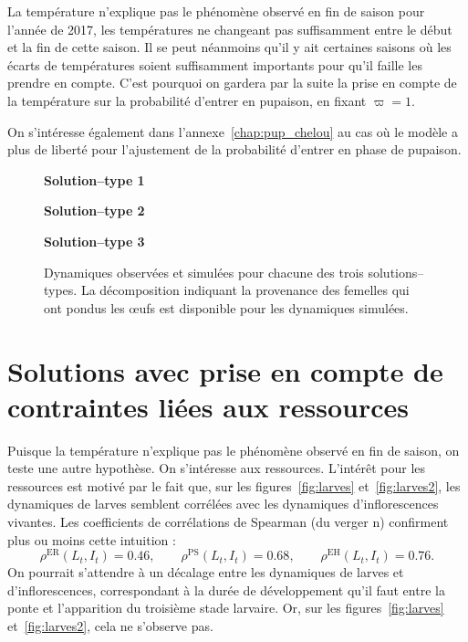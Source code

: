 La température n'explique pas le phénomène observé en fin de saison pour l'année de 2017, les températures ne changeant pas suffisamment entre le début et la fin de cette saison.
Il se peut néanmoins qu'il y ait certaines saisons où les écarts de températures soient suffisamment importants pour qu'il faille les prendre en compte.
C'est pourquoi on gardera par la suite la prise en compte de la température sur la probabilité d'entrer en pupaison, en fixant $\varpi = 1.$ 

On s'intéresse également dans l'annexe~\ref{chap:pup_chelou} au cas où le modèle a plus de liberté pour l'ajustement de la probabilité d'entrer en phase de pupaison.

\begin{figure}[h]
 \centering
 \textbf{Solution--type 1}
 
 
 \textbf{Solution--type 2}
 
 
 \textbf{Solution--type 3}
 
 \caption{Dynamiques observées et simulées pour chacune des trois solutions--types. La décomposition indiquant la provenance des femelles qui ont pondus les œufs est disponible pour les dynamiques simulées.}
 \label{fig:B}
\end{figure}

\clearpage
\section{Solutions avec prise en compte de contraintes liées aux ressources}
\label{chap:cde}

Puisque la température n'explique pas le phénomène observé en fin de saison, on teste une autre hypothèse.
On s'intéresse aux ressources.
L'intérêt pour les ressources est motivé par le fait que, sur les figures~\ref{fig:larves} et~\ref{fig:larves2}, les dynamiques de larves semblent corrélées avec les dynamiques d'inflorescences vivantes.
Les coefficients de corrélations de Spearman (du verger n) confirment plus ou moins cette intuition :
\[
\rho^{\text{ER}}\left( L_t, I_t  \right) =0.46,  \qquad \rho^{\text{PS}}\left( L_t, I_t  \right) =0.68, \qquad \rho^{\text{EH}}\left( L_t, I_t  \right) =0.76.
\]
On pourrait s'attendre à un décalage entre les dynamiques de larves et d'inflorescences, correspondant à la durée de développement qu'il faut entre la ponte et l'apparition du troisième stade larvaire.
Or, sur les figures~\ref{fig:larves} et~\ref{fig:larves2}, cela ne s'observe pas.

